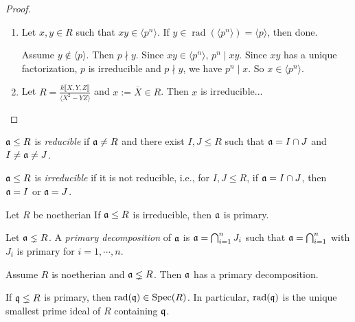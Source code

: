 \begin{proof}
    \begin{enumerate}
        \item 
            Let $x,y \in R$ such that $xy \in \langle p^{n} \rangle$. If $y \in \operatorname{rad}(\langle p^{n} \rangle) = \langle p \rangle$, then done. \par 
            Assume $y \not \in \langle p \rangle$. Then $p \nmid y$. Since $xy \in \langle p^{n} \rangle$, $p^{n} \mid xy$. Since $xy$ has a unique factorization, $p$ is irreducible and $p \nmid y$, we have $p^{n} \mid x$. So $x \in \langle p^{n} \rangle$.
        \item Let $R = \frac{k\llbracket X,Y,Z \rrbracket}{\langle X^{2}-YZ \rangle}$ and $x := \overbar{X} \in R$. Then $x$ is irreducible...
        
    \end{enumerate}
\end{proof}

\begin{definition}
    $\mathfrak{a} \leq R$ is \emph{reducible} if $\mathfrak{a} \neq R$ and there exist $I,J \leq R$ such that $\mathfrak{a} = I \cap J$ and $I \neq \mathfrak{a} \neq J$. \par 
    $\mathfrak{a} \leq R$ is \emph{irreducible} if it is not reducible, i.e., for $I,J \leq R$, if $\mathfrak{a} = I \cap J$, then $\mathfrak{a} = I$ or $\mathfrak{a} = J$.
\end{definition}

\begin{example}
\end{example}

\begin{proposition}
    Let $R$ be noetherian If $\mathfrak{a} \leq R$ is irreducible, then $\mathfrak{a}$ is primary.
\end{proposition}

\begin{definition}
    Let $\mathfrak{a} \lneq R$. A \emph{primary decomposition} of $\mathfrak{a}$ is $\mathfrak{a} = \bigcap_{i=1}^{n} J_i$ such that $\mathfrak{a} = \bigcap_{i=1}^{n}$ with $J_i$ is primary for $i = 1,\cdots,n$.
\end{definition}

\begin{theorem}[Noether]
    Assume $R$ is noetherian and $\mathfrak{a} \lneq R$. Then $\mathfrak{a}$ has a primary decomposition.
\end{theorem}

\begin{proposition}
    If $\mathfrak{q} \lneq R$ is primary, then $\operatorname{rad}(\mathfrak{q}) \in \operatorname{Spec}(R)$. In particular, $\operatorname{rad}(\mathfrak{q})$ is the unique smallest prime ideal of $R$ containing $\mathfrak{q}$.
\end{proposition}

